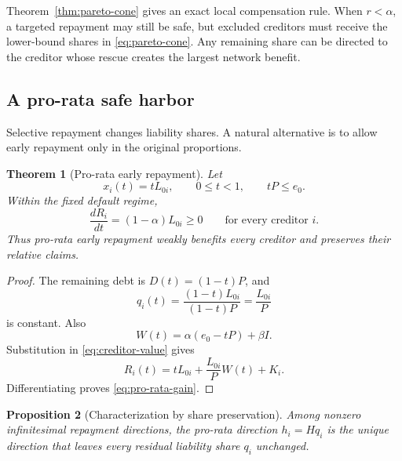 \documentclass[11pt]{article}
\newtheorem{theorem}{Theorem}[section]
\newtheorem{proposition}[theorem]{Proposition}
\theoremstyle{definition}
\theoremstyle{remark}
\begin{document}
Theorem~\ref{thm:pareto-cone} gives an exact local compensation rule.  When
$r<\alpha$, a targeted repayment may still be safe, but excluded creditors
must receive the lower-bound shares in \eqref{eq:pareto-cone}.  Any remaining
share can be directed to the creditor whose rescue creates the largest network
benefit.

\subsection{A pro-rata safe harbor}

Selective repayment changes liability shares.  A natural alternative is to
allow early repayment only in the original proportions.

\begin{theorem}[Pro-rata early repayment]\label{thm:pro-rata}
Let
\begin{equation}
  x_i(t)=tL_{0i},
  \qquad 0\leq t<1,
  \qquad tP\leq e_0.
\end{equation}
Within the fixed default regime,
\begin{equation}\label{eq:pro-rata-gain}
  \frac{dR_i}{dt}=(1-\alpha)L_{0i}\geq0
  \qquad\text{for every creditor }i.
\end{equation}
Thus pro-rata early repayment weakly benefits every creditor and preserves
their relative claims.
\end{theorem}

\begin{proof}
The remaining debt is $D(t)=(1-t)P$, and
\begin{equation}
  q_i(t)=\frac{(1-t)L_{0i}}{(1-t)P}=\frac{L_{0i}}{P}
\end{equation}
is constant.  Also
\begin{equation}
  W(t)=\alpha(e_0-tP)+\beta I.
\end{equation}
Substitution in \eqref{eq:creditor-value} gives
\begin{equation}
  R_i(t)=tL_{0i}+\frac{L_{0i}}{P}W(t)+K_i.
\end{equation}
Differentiating proves \eqref{eq:pro-rata-gain}.
\end{proof}

\begin{proposition}[Characterization by share preservation]
Among nonzero infinitesimal repayment directions, the pro-rata direction
$h_i=Hq_i$ is the unique direction that leaves every residual liability share
$q_i$ unchanged.
\end{proposition}
\end{document}
